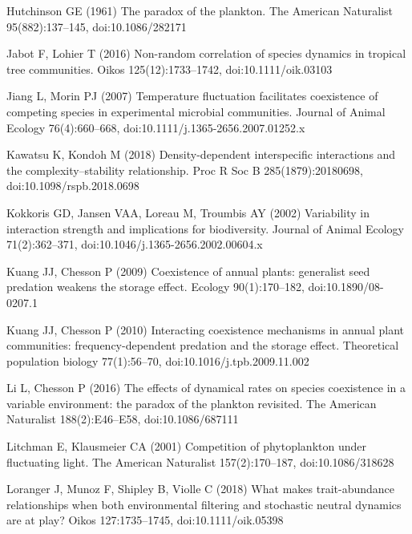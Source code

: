 \documentclass[a4paper,12pt]{article}
\begin{document}
\begin{thebibliography}{68}
Hutchinson GE (1961) The paradox of the plankton. The American Naturalist
  95(882):137--145, doi:{10.1086/282171}

Jabot F, Lohier T (2016) Non-random correlation of species dynamics in tropical
  tree communities. Oikos 125(12):1733--1742, doi:{10.1111/oik.03103}

Jiang L, Morin PJ (2007) Temperature fluctuation facilitates coexistence of
  competing species in experimental microbial communities. Journal of Animal
  Ecology 76(4):660--668, doi:{10.1111/j.1365-2656.2007.01252.x}

Kawatsu K, Kondoh M (2018) Density-dependent interspecific interactions and the
  complexity--stability relationship. Proc R Soc B 285(1879):20180698,
  doi:{10.1098/rspb.2018.0698}

Kokkoris GD, Jansen VAA, Loreau M, Troumbis AY (2002) Variability in
  interaction strength and implications for biodiversity. Journal of Animal
  Ecology 71(2):362--371, doi:{10.1046/j.1365-2656.2002.00604.x}

Kuang JJ, Chesson P (2009) Coexistence of annual plants: generalist seed
  predation weakens the storage effect. Ecology 90(1):170--182,
  doi:{10.1890/08-0207.1}

Kuang JJ, Chesson P (2010) Interacting coexistence mechanisms in annual plant
  communities: frequency-dependent predation and the storage effect.
  Theoretical population biology 77(1):56--70, doi:{10.1016/j.tpb.2009.11.002}

Li L, Chesson P (2016) The effects of dynamical rates on species coexistence in
  a variable environment: the paradox of the plankton revisited. The American
  Naturalist 188(2):E46--E58, doi:{10.1086/687111}

Litchman E, Klausmeier CA (2001) Competition of phytoplankton under fluctuating
  light. The American Naturalist 157(2):170--187, doi:{10.1086/318628}

Loranger J, Munoz F, Shipley B, Violle C (2018) What makes trait-abundance
  relationships when both environmental filtering and stochastic neutral
  dynamics are at play? Oikos 127:1735--1745, doi:{10.1111/oik.05398}


\end{thebibliography}
\end{document}
